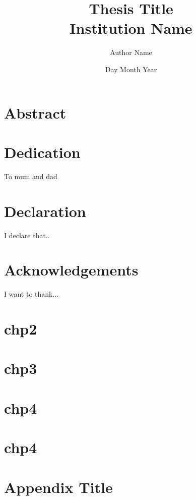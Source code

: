 \documentclass[12pt,twoside]{report}
\begin{document}
\title{
	{Thesis Title}\\
	{\large Institution Name}\\
}
\author{Author Name}
\date{Day Month Year}

\chapter*{Abstract}
\cite{einstein}

\chapter*{Dedication}
To mum and dad

\chapter*{Declaration}
I declare that..

\chapter*{Acknowledgements}
I want to thank...

\tableofcontents
\listoffigures 
\listoftables

\chapter{chp2}


\chapter{chp3}


\chapter{chp4}


\chapter{chp4}


\appendix
\chapter{Appendix Title}


\printbibliography
\end{document}
